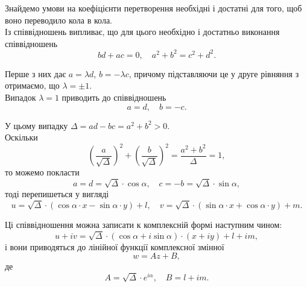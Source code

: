 Знайдемо умови на коефіцієнти перетворення  необхідні і достатні для того, щоб воно переводило кола в кола. \\

Із співвідношень  випливає, що для цього необхідно і достатньо виконання співвідношень
\begin{equation}
    \label{eq:27.10}
    b d + a c = 0, \quad a^2 + b^2 = c^2 + d^2.
\end{equation}

Перше з них дає $a = \lambda d$, $b = -\lambda c$, причому підставляючи це у друге рівняння з  отримаємо, що $\lambda = \pm 1$. \\

Випадок $\lambda = 1$ приводить до співвідношень
\begin{equation}
    \label{eq:27.11}
    a = d, \quad b = -c.
\end{equation}

У цьому випадку $\Delta = a d - b c = a^2 + b^2 > 0$. \\

Оскільки 
\begin{equation*}
    \left( \dfrac{a}{\sqrt{\Delta}} \right)^2 + \left( \dfrac{b}{\sqrt{\Delta}} \right)^2 = \dfrac{a^2 + b^2}{\Delta} = 1,
\end{equation*}
то можемо покласти
\begin{equation*}
    a = d = \sqrt{\Delta} \cdot \cos \alpha, \quad c = - b = \sqrt{\Delta} \cdot \sin \alpha,
\end{equation*}
тоді  перепишеться у вигляді
\begin{equation*}
    u = \sqrt{\Delta} \cdot (\cos \alpha \cdot x - \sin \alpha \cdot y) + l, \quad v = \sqrt{\Delta} \cdot ( \sin \alpha \cdot x + \cos \alpha \cdot y) + m.
\end{equation*}

Ці співвідношення можна записати к комплексній формі наступним чином:
\begin{equation*}
    u + i v = \sqrt{\Delta} \cdot (\cos \alpha + i \sin \alpha) \cdot (x + i y) + l + i m,
\end{equation*}
і вони приводяться до лінійної функції комплексної змінної 
\begin{equation}
    \label{eq:27.12}
    w = A z + B,
\end{equation}
де 
\begin{equation}
    \label{eq:27.13}
    A = \sqrt{\Delta} \cdot e^{i \alpha}, \quad B = l + i m.
\end{equation}

